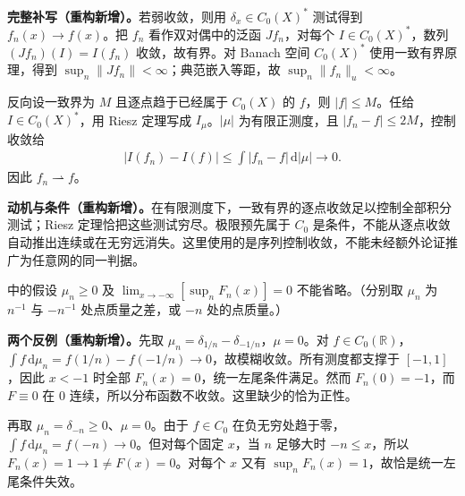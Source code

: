 \documentclass[../../main.tex]{subfiles}
\begin{document}
\begin{solution}
\textbf{完整补写（重构新增）。}若弱收敛，则用 $\delta_x\in C_0(X)^*$ 测试得到 $f_n(x)\to f(x)$。把 $f_n$ 看作双对偶中的泛函 $Jf_n$，对每个 $I\in C_0(X)^*$，数列 $(Jf_n)(I)=I(f_n)$ 收敛，故有界。对 Banach 空间 $C_0(X)^*$ 使用一致有界原理，得到 $\sup_n\|Jf_n\|<\infty$；典范嵌入等距，故 $\sup_n\|f_n\|_u<\infty$。

反向设一致界为 $M$ 且逐点趋于已经属于 $C_0(X)$ 的 $f$，则 $|f|\leqslant M$。任给 $I\in C_0(X)^*$，用 Riesz 定理写成 $I_\mu$。$|\mu|$ 为有限正测度，且 $|f_n-f|\leqslant2M$，控制收敛给
\begin{align*}
|I(f_n)-I(f)|\leqslant\int|f_n-f|\,\mathrm d|\mu|\longrightarrow0.
\end{align*}
因此 $f_n\rightharpoonup f$。
\end{solution}
\begin{remark}
\textbf{动机与条件（重构新增）。}在有限测度下，一致有界的逐点收敛足以控制全部积分测试；Riesz 定理恰把这些测试穷尽。极限预先属于 $C_0$ 是条件，不能从逐点收敛自动推出连续或在无穷远消失。这里使用的是序列控制收敛，不能未经额外论证推广为任意网的同一判据。
\end{remark}
\begin{exercise}\label{exercise:ch07-distribution-assumptions}
中的假设 $\mu_n\geqslant0$ 及 $\lim_{x\to-\infty}[\sup_nF_n(x)]=0$ 不能省略。（分别取 $\mu_n$ 为 $n^{-1}$ 与 $-n^{-1}$ 处点质量之差，或 $-n$ 处的点质量。）
\end{exercise}
\begin{solution}
\textbf{两个反例（重构新增）。}先取 $\mu_n=\delta_{1/n}-\delta_{-1/n}$，$\mu=0$。对 $f\in C_0(\mathbb R)$，$\int f\,\mathrm d\mu_n=f(1/n)-f(-1/n)\to0$，故模糊收敛。所有测度都支撑于 $[-1,1]$，因此 $x<-1$ 时全部 $F_n(x)=0$，统一左尾条件满足。然而 $F_n(0)=-1$，而 $F\equiv0$ 在 $0$ 连续，所以分布函数不收敛。这里缺少的恰为正性。

再取 $\mu_n=\delta_{-n}\geqslant0$、$\mu=0$。由于 $f\in C_0$ 在负无穷处趋于零，$\int f\,\mathrm d\mu_n=f(-n)\to0$。但对每个固定 $x$，当 $n$ 足够大时 $-n\leqslant x$，所以 $F_n(x)=1\to1\ne F(x)=0$。对每个 $x$ 又有 $\sup_nF_n(x)=1$，故恰是统一左尾条件失效。
\end{solution}
\end{document}
